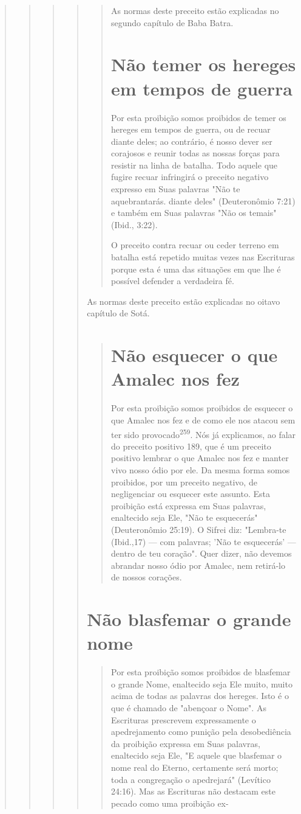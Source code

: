\begin{quote}
\begin{quote}
\begin{quote}
\begin{quote}
\begin{quote}
As normas deste preceito estão explicadas no segundo capítulo de Baba
Batra.

\section{Não temer os hereges em tempos de guerra}

Por esta proibição somos proibidos de temer os hereges em tempos de
guerra, ou de recuar diante deles; ao contrário, é nosso dever ser
corajosos e reunir todas as nossas forças para resistir na linha de
batalha. Todo aquele que fugire recuar infringirá o preceito negativo
expresso em Suas palavras "Não te aquebrantarás. diante deles"
(Deuteronômio 7:21) e também em Suas pala­vras "Não os temais" (Ibid.,
3:22).

O preceito contra recuar ou ceder terreno em batalha está repetido
muitas vezes nas Escrituras porque esta é uma das situações em que lhe é
possí­vel defender a verdadeira fé.
\end{quote}

As normas deste preceito estão explicadas no oitavo capítulo de Sotá.

\begin{quote}
\section{Não esquecer o que Amalec nos fez}

Por esta proibição somos proibidos de esquecer o que Amalec nos fez e de
como ele nos atacou sem ter sido provocado\textsuperscript{259}. Nós já
explicamos, ao falar do preceito positivo 189, que é um preceito
positivo lembrar o que Amalec nos fez e manter vivo nosso ódio por ele.
Da mesma forma somos proi­bidos, por um preceito negativo, de
negligenciar ou esquecer este assunto. Es­ta proibição está expressa em
Suas palavras, enaltecido seja Ele, "Não te esque­cerás" (Deuteronômio
25:19). O Sifrei diz: "Lembra-te (Ibid.,17) --- com pala­vras; 'Não te
esquecerás' --- dentro de teu coração". Quer dizer, não devemos abrandar
nosso ódio por Amalec, nem retirá-lo de nossos corações.
\end{quote}

\section{Não blasfemar o grande nome}

\begin{quote}
Por esta proibição somos proibidos de blasfemar o grande Nome,
enaltecido seja Ele muito, muito acima de todas as palavras dos hereges.
Isto é o que é chamado de "abençoar o Nome". As Escrituras prescrevem
expressa­mente o apedrejamento como punição pela desobediência da
proibição expressa em Suas palavras, enaltecido seja Ele, "E aquele que
blasfemar o nome real do Eterno, certamente será morto; toda a
congregação o apedrejará" (Levítico 24:16). Mas as Escrituras não
destacam este pecado como uma proibição ex-


\end{quote}
\end{quote}
\end{quote}
\end{quote}
\end{quote}
